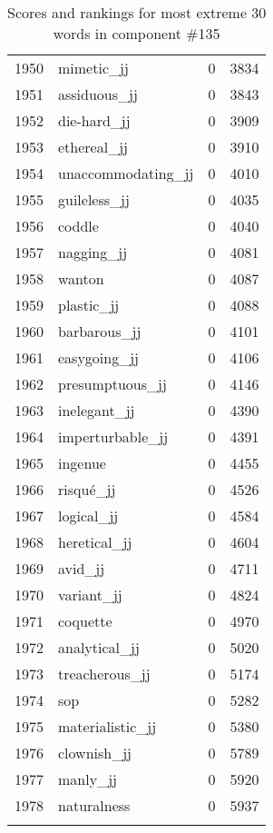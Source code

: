\begin{longtable}[!htbp]{| rlr@{.}l |}
    1950 & mimetic\_jj & 0 & 3834 \\
    1951 & assiduous\_jj & 0 & 3843 \\
    1952 & die-hard\_jj & 0 & 3909 \\
    1953 & ethereal\_jj & 0 & 3910 \\
    1954 & unaccommodating\_jj & 0 & 4010 \\
    1955 & guileless\_jj & 0 & 4035 \\
    1956 & coddle & 0 & 4040 \\
    1957 & nagging\_jj & 0 & 4081 \\
    1958 & wanton & 0 & 4087 \\
    1959 & plastic\_jj & 0 & 4088 \\
    1960 & barbarous\_jj & 0 & 4101 \\
    1961 & easygoing\_jj & 0 & 4106 \\
    1962 & presumptuous\_jj & 0 & 4146 \\
    1963 & inelegant\_jj & 0 & 4390 \\
    1964 & imperturbable\_jj & 0 & 4391 \\
    1965 & ingenue & 0 & 4455 \\
    1966 & risqué\_jj & 0 & 4526 \\
    1967 & logical\_jj & 0 & 4584 \\
    1968 & heretical\_jj & 0 & 4604 \\
    1969 & avid\_jj & 0 & 4711 \\
    1970 & variant\_jj & 0 & 4824 \\
    1971 & coquette & 0 & 4970 \\
    1972 & analytical\_jj & 0 & 5020 \\
    1973 & treacherous\_jj & 0 & 5174 \\
    1974 & sop & 0 & 5282 \\
    1975 & materialistic\_jj & 0 & 5380 \\
    1976 & clownish\_jj & 0 & 5789 \\
    1977 & manly\_jj & 0 & 5920 \\
    1978 & naturalness & 0 & 5937 \\
    \hline
    \caption{Scores and rankings for most extreme 30 words in component \#135} \\
\end{longtable}
